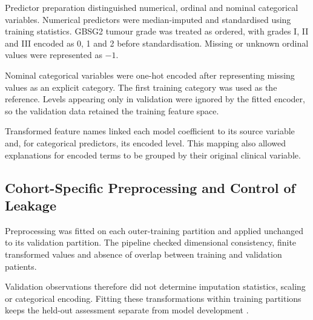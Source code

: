 Predictor preparation distinguished numerical, ordinal and nominal categorical variables. Numerical predictors were median-imputed and standardised using training statistics. GBSG2 tumour grade was treated as ordered, with grades I, II and III encoded as 0, 1 and 2 before standardisation. Missing or unknown ordinal values were represented as $-1$.

Nominal categorical variables were one-hot encoded after representing missing values as an explicit category. The first training category was used as the reference. Levels appearing only in validation were ignored by the fitted encoder, so the validation data retained the training feature space.

Transformed feature names linked each model coefficient to its source variable and, for categorical predictors, its encoded level. This mapping also allowed explanations for encoded terms to be grouped by their original clinical variable.

\subsection{Cohort-Specific Preprocessing and Control of Leakage}\label{cohort-specific-preprocessing-and-control-of-leakage.}

Preprocessing was fitted on each outer-training partition and applied unchanged to its validation partition. The pipeline checked dimensional consistency, finite transformed values and absence of overlap between training and validation patients.

Validation observations therefore did not determine imputation statistics, scaling or categorical encoding. Fitting these transformations within training partitions keeps the held-out assessment separate from model development \cite{ref32,ref34}.

